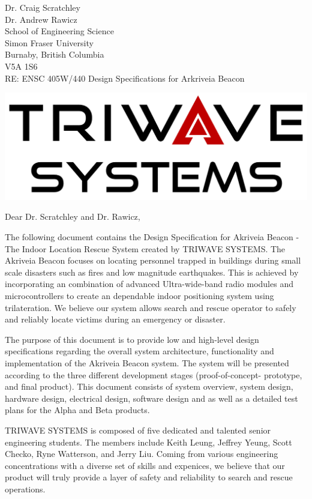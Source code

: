 \documentclass[11pt]{letter}
\date{July 7, 2019}
\begin{document}
\begin{letter}{
Dr. Craig Scratchley\\
Dr. Andrew Rawicz\\
School of Engineering Science\\
Simon Fraser University\\
Burnaby, British Columbia\\
V5A 1S6\\
\bigskip
RE: ENSC 405W/440 Design Specifications for Arkriveia Beacon\\
} 


\begin{center}
\includegraphics[scale=0.25]{./images/logo_W.png}
\end{center}

\opening{Dear Dr. Scratchley and Dr. Rawicz,} 

\medskip
The following document contains the Design Specification for Akriveia Beacon - The Indoor Location Rescue System created by TRIWAVE SYSTEMS. The Akriveia Beacon focuses on locating personnel trapped in buildings during small scale disasters such as fires and low magnitude earthquakes. This is achieved by incorporating an combination of advanced Ultra-wide-band radio modules and microcontrollers to create an dependable indoor positioning system using trilateration. We believe our system allows search and rescue operator to safely and reliably locate victims during an emergency or disaster.

\medskip
The purpose of this document is to provide low and high-level design specifications regarding the overall system architecture, functionality and implementation of the Akriveia Beacon system. The system will be presented according to the three different development stages (proof-of-concept- prototype, and final product). This document consists of system overview, system design, hardware design, electrical design, software design and as well as a detailed test plans for the Alpha and Beta products.

\medskip
TRIWAVE SYSTEMS is composed of five dedicated and talented senior engineering students. The
members include Keith Leung, Jeffrey Yeung, Scott Checko, Ryne Watterson, and Jerry Liu. Coming
from various engineering concentrations with a diverse set of skills and expenices, we believe that our
product will truly provide a layer of safety and reliability to search and rescue operations.


\end{letter}
\end{document}
